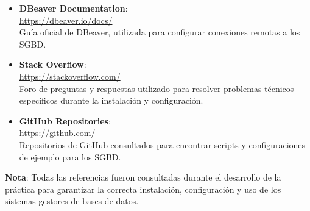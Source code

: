 \documentclass{article}
\begin{document}
\begin{itemize}
    \item \textbf{DBeaver Documentation}: \\
    \url{https://dbeaver.io/docs/} \\
    Guía oficial de DBeaver, utilizada para configurar conexiones remotas a los SGBD.

    \item \textbf{Stack Overflow}: \\
    \url{https://stackoverflow.com/} \\
    Foro de preguntas y respuestas utilizado para resolver problemas técnicos específicos durante la instalación y configuración.

    \item \textbf{GitHub Repositories}: \\
    \url{https://github.com/} \\
    Repositorios de GitHub consultados para encontrar scripts y configuraciones de ejemplo para los SGBD.
\end{itemize}

\textbf{Nota}: Todas las referencias fueron consultadas durante el desarrollo de la práctica para garantizar la correcta instalación, configuración y uso de los sistemas gestores de bases de datos.
\end{document}

